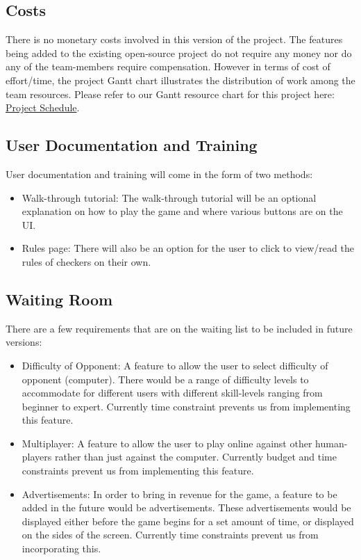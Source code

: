 \documentclass[12pt, titlepage]{article}
\begin{document}
\subsection{Costs}
There is no monetary costs involved in this version of the project. The features being added to the existing open-source project do not require any money nor do any of the team-members require compensation. 
However in terms of cost of effort/time, the project Gantt chart illustrates the distribution of work among the team resources. Please refer to our Gantt resource chart for this project here: \href{https://gitlab.cas.mcmaster.ca/bargea/3xa3-g09-2021/-/blob/master/BlankProjectTemplate/ProjectSchedule/3XA3\%20Group\%20Project.pdf}{Project Schedule}.

\subsection{User Documentation and Training}
User documentation and training will come in the form of two methods:
\begin{itemize}
    \item Walk-through tutorial: The walk-through tutorial will be an optional explanation on how to play the game and where various buttons are on the UI.
    \item Rules page: There will also be an option for the user to click to view/read the rules of checkers on their own.
\end{itemize}
\subsection{Waiting Room}
There are a few requirements that are on the waiting list to be included in future versions:
\begin{itemize}
    \item Difficulty of Opponent: A feature to allow the user to select difficulty of opponent (computer). There would be a range of difficulty levels to accommodate for different users with different skill-levels ranging from beginner to expert. Currently time constraint prevents us from implementing this feature.
    \item Multiplayer: A feature to allow the user to play online against other human-players rather than just against the computer. Currently budget and time constraints prevent us from implementing this feature.
    \item Advertisements: In order to bring in revenue for the game, a feature to be added in the future would be advertisements. These advertisements would be displayed either before the game begins for a set amount of time, or displayed on the sides of the screen. Currently time constraints prevent us from incorporating this.
\end{itemize}
\end{document}

